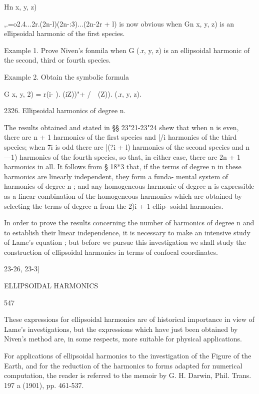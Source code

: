 {{Hn  x, y, z) 



,.=o2.4...2r.(2n-l)(2n-:3)...(2n-2r + l) 
is now obvious when Gn  x, y, z) is an ellipsoidal harmonic of the first species. 

Example 1. Prove Niven's fonmila when G  (.r, y, z) is an ellipsoidal harmonic of the 
second, third or fourth species. 

Example 2. Obtain the symbolic formula 

G  x, y, 2) = r(i- ). (iZ))"+ /\  \  (Z)).   (.r, y, z). 

2326. Ellipsoidal harmonics of degree n. 

The results obtained and stated in §§ 23"21-23"24 shew that when n is 
even, there are  n + 1 harmonics of the first species and |/i harmonics of the 
third species; when 7i is odd there are |(?i + l) harmonics of the second 
species and    n —1) harmonics of the fourth species, so that, in either case, 
there are 2n + 1 harmonics in all. It follows from § 18*3 that, if the terms of 
degree n in these harmonics are linearly independent, they form a funda- 
mental system of harmonics of degree n ; and any homogeneous harmonic of 
degree n is expressible as a linear combination of the homogeneous harmonics 
which are obtained by selecting the terms of degree n from the 2)i + 1 ellip- 
soidal harmonics. 

In order to prove the results concerning the number of harmonics of 
degree n and to establish their linear independence, it is necessary to make 
an intensive study of Lame's equation ; but before we pursue this investigation 
we shall study the construction of ellipsoidal harmonics in terms of confocal 
coordinates. 



23-26, 23-3] 



ELLIPSOIDAL HARMONICS 



547 



These expressions for ellipsoidal harmonics are of historical importance in view of 
Lame's investigations, but the expressions which have just been obtained by Niven's 
method are, in some respects, more suitable for physical applications. 

For applications of ellipsoidal harmonics to the investigation of the Figure of the Earth, 
and for the reduction of the harmonics to forms adapted for numerical computation, the 
reader is referred to the memoir by G. H. Darwin, Phil. Trans. 197 a (1901), pp. 461-537. 

}}
